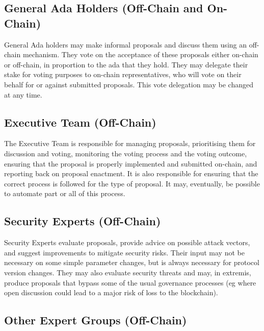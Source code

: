 \subsection{General Ada Holders (Off-Chain and On-Chain)}

General Ada holders may make informal proposals and discuss them using an off-chain mechanism.  They vote on the acceptance of these proposals
either on-chain or off-chain, in proportion to the ada that they hold.  They may delegate their stake for voting purposes to on-chain representatives,
who will vote on their behalf for or against submitted proposals.  This vote delegation may be changed at any time.

\subsection{Executive Team (Off-Chain)}

The Executive Team is responsible for managing proposals, prioritising them for discussion and voting, monitoring the voting process and the
voting outcome, ensuring that the proposal is properly implemented and submitted on-chain, and reporting back on proposal enactment.
It is also responsible for ensuring that the correct process is followed for the type of proposal.  It may, eventually, be possible to automate part or all of this process.

\subsection{Security Experts (Off-Chain)}

Security Experts evaluate proposals, provide advice on possible attack vectors, and suggest improvements to mitigate security risks.
Their input may not be necessary on some simple parameter changes, but is always necessary for protocol version changes.
They may also evaluate security threats and may, in extremis, produce proposals that bypass some of the usual governance processes
(eg where open discussion could lead to a major risk of loss to the blockchain).

\subsection{Other Expert Groups (Off-Chain)}

